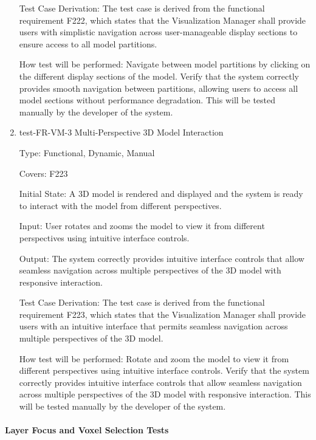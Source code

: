 \documentclass[12pt, titlepage]{article}
\begin{document}
\begin{enumerate}
Test Case Derivation: The test case is derived from the functional requirement F222, which states that the Visualization Manager shall provide users with simplistic navigation across user-manageable display sections to ensure access to all model partitions.
					
How test will be performed: Navigate between model partitions by clicking on the different display sections of the model. Verify that the system correctly provides smooth navigation between partitions, allowing users to access all model sections without performance degradation. This will be tested manually by the developer of the system.

\item{test-FR-VM-3 Multi-Perspective 3D Model Interaction\\}

Type: Functional, Dynamic, Manual

Covers: F223
					
Initial State: A 3D model is rendered and displayed and the system is ready to interact with the model from different perspectives.
					
Input: User rotates and zooms the model to view it from different perspectives using intuitive interface controls.
					
Output: The system correctly provides intuitive interface controls that allow seamless navigation across multiple perspectives of the 3D model with responsive interaction.

Test Case Derivation: The test case is derived from the functional requirement F223, which states that the Visualization Manager shall provide users with an intuitive interface that permits seamless navigation across multiple perspectives of the 3D model.
					
How test will be performed: Rotate and zoom the model to view it from different perspectives using intuitive interface controls. Verify that the system correctly provides intuitive interface controls that allow seamless navigation across multiple perspectives of the 3D model with responsive interaction. This will be tested manually by the developer of the system.

\end{enumerate}

\paragraph{Layer Focus and Voxel Selection Tests}
\end{document}
